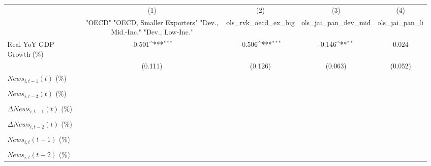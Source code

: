 {
\def\sym#1{\ifmmode^{#1}\else\(^{#1}\)\fi}
\begin{tabular}{l*{4}{c}}
\toprule
                    &\multicolumn{1}{c}{(1)}&\multicolumn{1}{c}{(2)}&\multicolumn{1}{c}{(3)}&\multicolumn{1}{c}{(4)}\\
                    &\multicolumn{1}{c}{ "OECD" "OECD, Smaller Exporters" "Dev., Mid.-Inc." "Dev., Low-Inc."}&\multicolumn{1}{c}{ols_rvk_oecd_ex_big}&\multicolumn{1}{c}{ols_jai_pan_dev_mid}&\multicolumn{1}{c}{ols_jai_pan_li}\\
\midrule
Real YoY GDP Growth (\%)&      -0.501\sym{***}&      -0.506\sym{***}&      -0.146\sym{**} &       0.024         \\
                    &     (0.111)         &     (0.126)         &     (0.063)         &     (0.052)         \\
\addlinespace
$ News_{i,t-1}(t)$ (\%)&                     &                     &                     &                     \\
                    &                     &                     &                     &                     \\
\addlinespace
$ News_{i,t-2}(t)$ (\%)&                     &                     &                     &                     \\
                    &                     &                     &                     &                     \\
\addlinespace
$ \Delta News_{i,t-1}(t)$ (\%)&                     &                     &                     &                     \\
                    &                     &                     &                     &                     \\
\addlinespace
$ \Delta News_{i,t-2}(t)$ (\%)&                     &                     &                     &                     \\
                    &                     &                     &                     &                     \\
\addlinespace
$ News_{i,t}(t+1)$ (\%)&                     &                     &                     &                     \\
                    &                     &                     &                     &                     \\
\addlinespace
$ News_{i,t}(t+2)$ (\%)&                     &                     &                     &                     \\

\end{tabular}}
